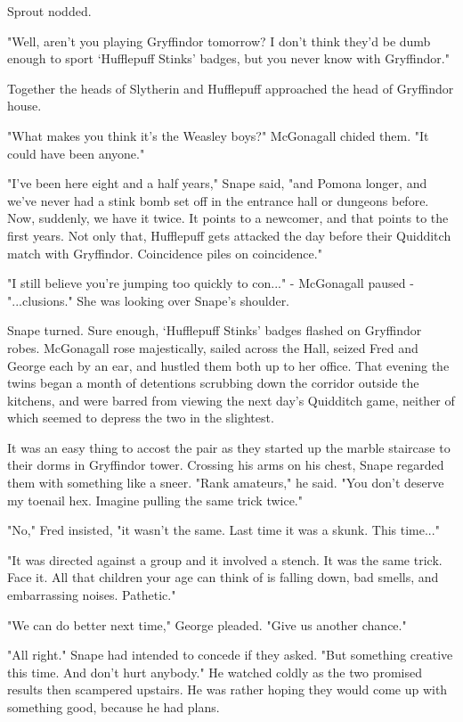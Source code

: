 \documentclass[a4paper,11pt]{article}
\begin{document}
Sprout nodded.

"Well, aren't you playing Gryffindor tomorrow? I don't think they'd be dumb enough to sport `Hufflepuff Stinks' badges, but you never know with Gryffindor."

Together the heads of Slytherin and Hufflepuff approached the head of Gryffindor house.

"What makes you think it's the Weasley boys?" McGonagall chided them. "It could have been anyone."

"I've been here eight and a half years," Snape said, "and Pomona longer, and we've never had a stink bomb set off in the entrance hall or dungeons before. Now, suddenly, we have it twice. It points to a newcomer, and that points to the first years. Not only that, Hufflepuff gets attacked the day before their Quidditch match with Gryffindor. Coincidence piles on coincidence."

"I still believe you're jumping too quickly to con..." - McGonagall paused - "...clusions." She was looking over Snape's shoulder.

Snape turned. Sure enough, `Hufflepuff Stinks' badges flashed on Gryffindor robes. McGonagall rose majestically, sailed across the Hall, seized Fred and George each by an ear, and hustled them both up to her office. That evening the twins began a month of detentions scrubbing down the corridor outside the kitchens, and were barred from viewing the next day's Quidditch game, neither of which seemed to depress the two in the slightest.

It was an easy thing to accost the pair as they started up the marble staircase to their dorms in Gryffindor tower. Crossing his arms on his chest, Snape regarded them with something like a sneer. "Rank amateurs," he said. "You don't deserve my toenail hex. Imagine pulling the same trick twice."

"No," Fred insisted, "it wasn't the same. Last time it was a skunk. This time..."

"It was directed against a group and it involved a stench. It was the same trick. Face it. All that children your age can think of is falling down, bad smells, and embarrassing noises. Pathetic."

"We can do better next time," George pleaded. "Give us another chance."

"All right." Snape had intended to concede if they asked. "But something creative this time. And don't hurt anybody." He watched coldly as the two promised results then scampered upstairs. He was rather hoping they would come up with something good, because he had plans.
\end{document}
